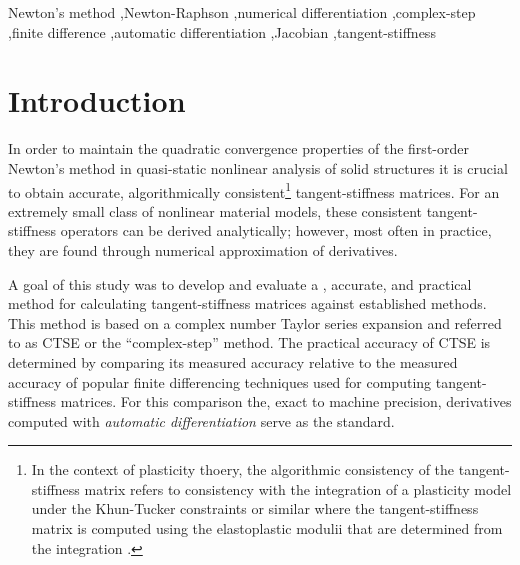 \documentclass[preprint,12pt]{elsarticle}
\begin{document}
\begin{frontmatter}
\begin{abstract}
\end{abstract}

\begin{keyword}
Newton's method \sep Newton-Raphson \sep numerical differentiation \sep complex-step \sep finite difference \sep automatic differentiation \sep Jacobian \sep tangent-stiffness
\end{keyword}

\end{frontmatter}



\section{Introduction}
\label{sec:intro} 

In order to maintain the quadratic convergence properties of the first-order Newton's method \cite{belytschko1999nonlinear} \cite[Ch.~13]{young2009} in quasi-static nonlinear analysis of solid structures it is crucial to obtain accurate, algorithmically consistent\footnote{ In the context of plasticity thoery, the algorithmic consistency of the tangent-stiffness matrix refers to consistency with the integration of a plasticity model under the Khun-Tucker constraints or similar where the tangent-stiffness matrix is computed using the elastoplastic modulii that are determined from the integration \cite{simo1998}.} tangent-stiffness matrices. For an extremely small class of nonlinear material models, these consistent tangent-stiffness operators can be derived analytically; however, most often in practice, they are found through numerical approximation of derivatives. 

A goal of this study was to develop and evaluate a  , accurate, and practical method for calculating tangent-stiffness matrices against established methods.  This   method is based on a complex number Taylor series expansion and referred to as CTSE or the ``complex-step'' method. The practical accuracy of CTSE is determined by comparing its measured accuracy relative to the measured accuracy of popular finite differencing techniques used for computing tangent-stiffness matrices. For this comparison the,  exact to machine precision, derivatives computed with \emph{automatic differentiation} serve as the standard.
\end{document}
